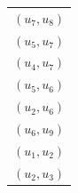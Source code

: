 \begin{prob}
\begin{subprobset}
\begin{subprob}
\begin{soln}
                \begin{tabular}{c}
                    $(u_7, u_8)$\\
                    $(u_5, u_7)$\\
                    $(u_4, u_7)$\\
                    $(u_5, u_6)$\\
                    $(u_2, u_6)$\\
                    $(u_6, u_9)$\\
                    $(u_1, u_2)$\\
                    $(u_2, u_3)$\\
                \end{tabular}
            \end{soln}

        \end{subprob}

    \end{subprobset}

\end{prob}
